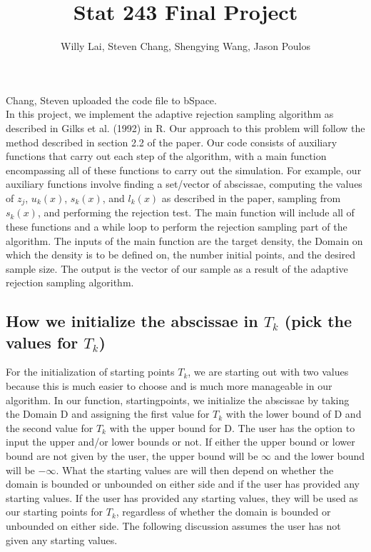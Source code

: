 \documentclass[12pt]{article}
\title{Stat 243 Final Project}
\author{Willy Lai, Steven Chang, Shengying Wang, Jason Poulos}
\begin{document}



\maketitle
Chang, Steven uploaded the code file to bSpace.\\
\newline
In this project, we implement the adaptive rejection sampling algorithm as described in Gilks et al. (1992) in R.  Our approach to this problem will follow the method described in section 2.2 of the paper.  Our code consists of auxiliary functions that carry out each step of the algorithm, with a main function encompassing all of these functions to carry out the simulation.  For example, our auxiliary functions involve finding a set/vector of abscissae, computing the values of $z_j$, $u_k(x)$, $s_k(x)$, and $l_k(x)$
as described in the paper, sampling from $s_k(x)$, and performing the rejection test.  The main function will include all of these functions and a while loop to perform the rejection sampling part of the algorithm.  The inputs of the main function are the target density, the Domain on which the density is to be defined on, the number initial points, and the desired sample size.  The output is the vector of our sample as a result of the adaptive rejection sampling algorithm.


\subsection*{How we initialize the abscissae in $T_k$ (pick the values for $T_k$)}

For the initialization of starting points $T_k$, we are starting out with two values because this is much easier to choose and is much more manageable in our algorithm.  In our function, startingpoints, we initialize the abscissae by taking the Domain D and assigning the first value for $T_k$ with the lower bound of D and the second value for $T_k$ with the upper bound for D.  The user has the option to input the upper and/or lower bounds or not.  If either the upper bound or lower bound are not given by the user, the upper bound will be $\infty$ and the lower bound will be $-\infty$.  What the starting values are will then depend on whether the domain is bounded or unbounded on either side and if the user has provided any starting values.  If the user has provided any starting values, they will be used as our starting points for $T_k$, regardless of whether the domain is bounded or unbounded on either side.  The following discussion assumes the user has not given any starting values.\\
\end{document}
